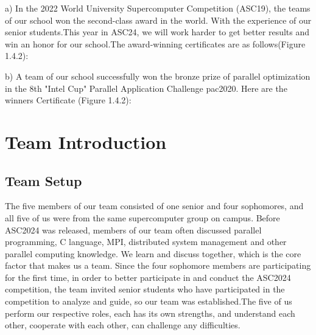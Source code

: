 \documentclass[a4paper,12pt]{article}
\begin{document}
a) In the 2022 World University Supercomputer Competition (ASC19), the teams of our school won the second-class award in the world. With the experience of our senior students.This year in ASC24, we will work harder to get better results and win an honor for our school.The award-winning certificates are as follows(Figure 1.4.2):

b) A team of our school successfully won the bronze prize of parallel optimization in the 8th "Intel Cup" Parallel Application Challenge pac2020. Here are the winners Certificate (Figure 1.4.2):


\newpage

\section{Team Introduction}

\subsection{Team Setup}

The five members of our team consisted of one senior and four sophomores, and all five of us were from the same supercomputer group on campus. Before ASC2024 was released, members of our team often discussed parallel programming, C language, MPI, distributed system management and other parallel computing knowledge. We learn and discuss together, which is the core factor that makes us a team. Since the four sophomore members are participating for the first time, in order to better participate in and conduct the ASC2024 competition, the team invited senior students who have participated in the competition to analyze and guide, so our team was established.The five of us perform our respective roles, each has its own strengths, and understand each other, cooperate with each other, can challenge any difficulties.
\end{document}
